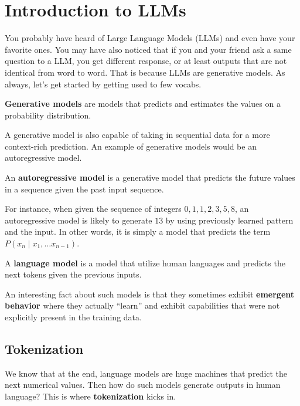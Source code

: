\documentclass[../../../main.tex]{subfiles}
\begin{document}
\section{Introduction to LLMs}

You probably have heard of Large Language Models (LLMs)
and even have your favorite ones. You may have also noticed
that if you and your friend ask a same question to a LLM,
you get different response, or at least outputs that are
not identical from word to word. That is because LLMs
are generative models. As always, let's get started by
getting used to few vocabs.

\begin{definition}{}{}
\textbf{Generative models} are models that predicts and
estimates the values on a probability distribution.
\end{definition}

A generative model is also capable of taking in sequential
data for a more context-rich prediction. An example of
generative models would be an autoregressive model.

\begin{definition}{}{}
An \textbf{autoregressive model} is a generative model
that predicts the future values in a sequence given the
past input sequence.
\end{definition}

For instance, when given the sequence of integers
$0, 1, 1, 2, 3, 5, 8$, an autoregressive model is likely
to generate $13$ by using previously learned pattern and
the input. In other words, it is simply a model that
predicts the term $P(x_n \mid x_1, \ldots x_{n-1})$.

\begin{definition}{}{}
A \textbf{language model} is a model that utilize human
languages and predicts the next tokens given the previous
inputs.
\end{definition}

An interesting fact about such models is that they sometimes
exhibit \textbf{emergent behavior} where they actually
``learn'' and exhibit capabilities that were not explicitly
present in the training data.

\subsection{Tokenization}

We know that at the end, language models are huge machines
that predict the next numerical values. Then how do such
models generate outputs in human language? This is where
\textbf{tokenization} kicks in.
\end{document}
